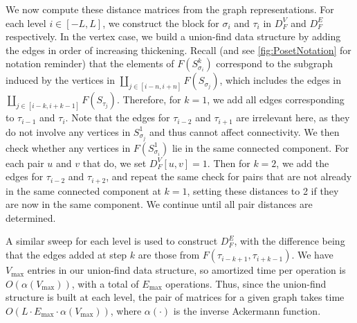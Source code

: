 We now compute these distance matrices from the graph representations.
For each level $i \in [-L,L]$, we construct the block for $\sigma_i$ and $\tau_i$ in $D_F^V$  and $D_F^E$ respectively.
In the vertex case, we build a union-find data structure by adding the edges in order of increasing thickening. 
Recall (and see \cref{fig:PosetNotation} for notation reminder) that the elements of $F(S^k_{\sigma_i})$ correspond to the subgraph induced by the vertices in $\coprod _{j \in [i-n,i+n]} F(S_{\sigma_j})$, which includes the edges in $\coprod_{j \in [i-k, i+k-1]}F(S_{\tau_j})$. 
Therefore, for $k=1$, we add all edges corresponding to $\tau_{i-1}$ and $\tau_i$. Note that the edges for $\tau_{i-2}$ and $\tau_{i+1}$ are irrelevant here, as they do not involve any vertices in $S_{\sigma_j}^1$ and thus cannot affect connectivity. We then check whether any vertices in $F(S_{\sigma_i}^1)$ lie in the same connected component. For each pair $u$ and $v$ that do, we set $D_F^V[u,v] = 1$.
Then for $k=2$, we add the edges for $\tau_{i-2}$ and $\tau_{i+2}$, and repeat the same check for pairs that are not already in the same connected component at $k=1$, setting these distances to 2 if they are now in the same component. 
We continue until all pair distances are determined. 

A similar sweep for each level is used to construct $D_F^E$, with the difference being that the edges added at step $k$ are those from $F(\tau_{i-k+1}, \tau_{i+k-1})$. 
We have $V_{\max}$ entries in our union-find data structure, so amortized time per operation is $O(\alpha(V_{\max}))$, with a total of $E_{\max}$ operations.
Thus, since the union-find structure is built at each level, the pair of matrices for a given graph takes time $O(L\cdot E_{\max} \cdot \alpha(V_{\max}))$, where $\alpha(\cdot)$ is the inverse Ackermann function. 
